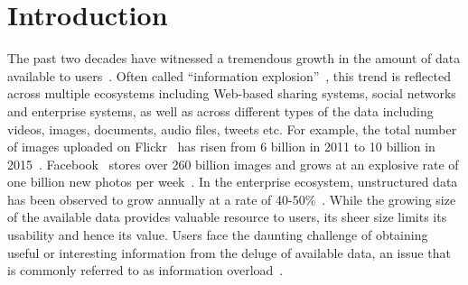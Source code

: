 \documentclass[12pt]{ucsddissertation}
\begin{document}
\mainmatter


\chapter{Introduction} 
The past two decades have witnessed a tremendous growth in the amount of data available to users~\cite{edmunds2000problem,ShuhuiAuthor15,IDCDataGrowth,Neilson2011}. Often called ``information explosion''~\cite{van2002information}, this trend is reflected across multiple ecosystems including Web-based sharing systems, social networks and enterprise systems, as well as across different types of the data including videos, images, documents, audio files, tweets etc. For example, the total number of images uploaded on Flickr~\cite{Flickr} has risen from 6 billion in 2011 to 10 billion in 2015~\cite{Flickr6B,Flickr10B}. Facebook~\cite{Facebook} stores over 260 billion images and grows at an explosive rate of one billion new photos per week~\cite{beaver2010finding}. In the enterprise ecosystem, unstructured data has been observed to grow annually at a rate of 40-50\%~\cite{IDCDataGrowth}. While the growing size of the available data provides valuable resource to users, its sheer size limits its usability and hence its value. Users face the daunting challenge of obtaining useful or interesting information from the deluge of available data, an issue that is commonly referred to as information overload~\cite{edmunds2000problem}.
\end{document}
